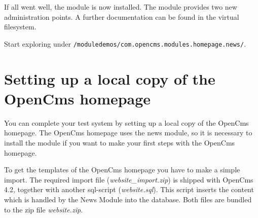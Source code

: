 If all went well, the module is now installed.
The module provides two new administration points. A further documentation
can be found in the virtual filesystem. 

Start exploring under \texttt{/moduledemos/com.opencms.modules.homepage.news/}. 


\section{Setting up a local copy of the OpenCms homepage}
You can complete your test system by setting up a local copy of the OpenCms homepage.
The OpenCms homepage uses the news module, so it is necessary to install the module if
you want to make your first steps with the OpenCms homepage.

To get the templates of the OpenCms homepage you have to make a simple import.
The required import file (\textit{website\_import.zip}) is shipped with OpenCms 4.2,
together with another sql-script (\textit{website.sql}). This script inserts the content
which is handled by the News Module into the database.
Both files are bundled to the zip file \textit{website.zip}.

